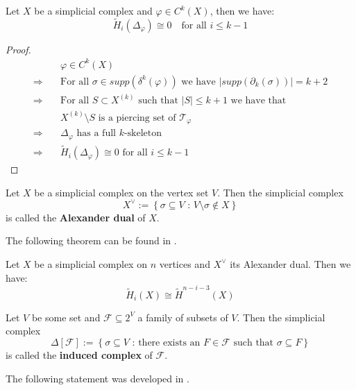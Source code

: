 \begin{thm}
Let \(X\) be a simplicial complex and \(\varphi\in C^k(X)\), then we have:
\[
\tilde{H}_i(\Delta_{\varphi})\cong 0\quad\text{for all }i\leq k-1
\]
\begin{proof}
\begin{align*}
& \varphi\in C^k(X) \\
\Longrightarrow \quad & \text{For all }\sigma\in supp(\delta^k(\varphi))\text{ we have }\left|supp(\partial_k(\sigma))\right|=k+2 \\
\Longrightarrow \quad & \text{For all }S\subset X^{(k)}\text{ such that }\left|S\right|\leq k+1\text{ we have that } \\ & X^{(k)}\setminus S\text{ is a piercing set of }\mathcal{T}_{\varphi} \\
\Longrightarrow \quad & \Delta_{\varphi}\text{ has a full }k\text{-skeleton} \\
\Longrightarrow \quad & \tilde{H}_i(\Delta_{\varphi})\cong 0\text{ for all }i\leq k-1
\end{align*}
\end{proof}
\end{thm}

\begin{defi}
Let \(X\) be a simplicial complex on the vertex set \(V\). Then the simplicial complex
\[
X^{\lor}:=\left\{\sigma\subseteq V\text{ : }V\setminus\sigma\notin X\right\}
\]
is called the \textbf{Alexander dual} of \(X\).
\end{defi}

The following theorem can be found in \cite{8}.

\begin{thm}\label{theorem12}
Let \(X\) be a simplicial complex on \(n\) vertices and \(X^{\lor}\) its Alexander dual. Then we have:
\[
\tilde{H}_i(X)\cong\tilde{H}^{n-i-3}(X)
\]
\end{thm}

\begin{defi}
Let \(V\) be some set and \(\mathcal{F}\subseteq 2^V\) a family of subsets of \(V\). Then the simplicial complex
\[
\Delta\left[\mathcal{F}\right]:=\left\{\sigma\subseteq V\text{ : there exists an }F\in\mathcal{F}\text{ such that }\sigma\subseteq F\right\}
\]
is called the \textbf{induced complex} of \(\mathcal{F}\). 
\end{defi}

The following statement was developed in \cite{9}.

